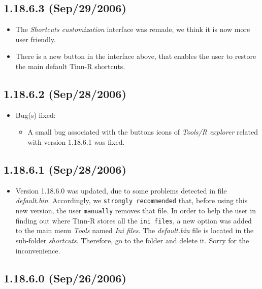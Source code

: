 \subsection{1.18.6.3 (Sep/29/2006)}

\begin{itemize}
  \item The \textit{Shortcuts customization} interface was remade, we
    think it is now more user friendly.
  \item There is a new button in the interface above, that enables the
    user to restore the main default Tinn-R shortcuts.
\end{itemize}


\subsection{1.18.6.2 (Sep/28/2006)}

\begin{itemize}
  \item Bug(s) fixed:
    \begin{itemize}
      \item A small bug associated with the buttons icons of \textit{Tools/R explorer}
        related with version 1.18.6.1 was fixed.
    \end{itemize}
\end{itemize}


\subsection{1.18.6.1 (Sep/28/2006)}

\begin{itemize}
  \item Version 1.18.6.0 was updated, due to some problems detected in
    file \textit{default.bin}. Accordingly, we \texttt{strongly recommended}
    that, before using this new version, the user \texttt{manually} removes
    that file. In order to help the user in finding out where Tinn-R stores all
    the \texttt{ini files}, a new option was added to the main menu
    \textit{Tools} named \textit{Ini files}. The \textit{default.bin} file
    is located in the sub-folder \textit{shortcuts}. Therefore, go to the
    folder and delete it. Sorry for the inconvenience.
\end{itemize}


\subsection{1.18.6.0 (Sep/26/2006)}

